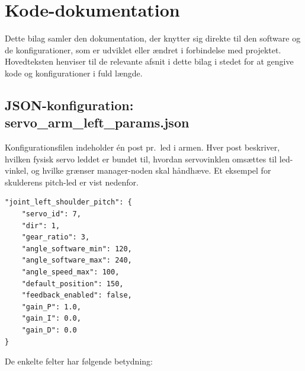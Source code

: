 
\chapter{Kode-dokumentation}
\label{AppendixC}

Dette bilag samler den dokumentation, der knytter sig direkte til den
software og de konfigurationer, som er udviklet eller ændret i
forbindelse med projektet. Hovedteksten henviser til de relevante
afsnit i dette bilag i stedet for at gengive kode og konfigurationer
i fuld længde.

\section{JSON-konfiguration: servo\_arm\_left\_params.json}
\label{sec:appB-json}

Konfigurationsfilen indeholder én post pr.~led i armen. Hver post
beskriver, hvilken fysisk servo leddet er bundet til, hvordan
servovinklen omsættes til led-vinkel, og hvilke grænser
manager-noden skal håndhæve. Et eksempel for skulderens
pitch-led er vist nedenfor.

\begin{verbatim}
"joint_left_shoulder_pitch": {
    "servo_id": 7,
    "dir": 1,
    "gear_ratio": 3,
    "angle_software_min": 120,
    "angle_software_max": 240,
    "angle_speed_max": 100,
    "default_position": 150,
    "feedback_enabled": false,
    "gain_P": 1.0,
    "gain_I": 0.0,
    "gain_D": 0.0
}
\end{verbatim}

De enkelte felter har følgende betydning:

